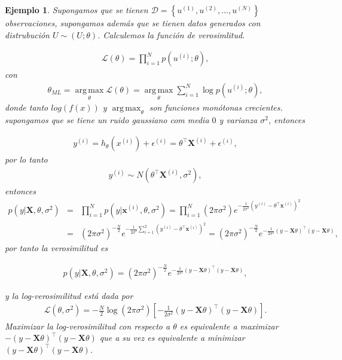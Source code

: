 \documentclass[12pt]{article}
\newtheorem{Ejem}{Ejemplo}%
\begin{document}
\begin{Ejem}
Supongamos que se tienen $\mathcal{D}=\left\{u^{(1)},u^{(2)},\ldots,u^{(N)}\right\}$ observaciones, supongamos adem\'as que se tienen datos generados con distrubuci\'on $U\sim\left(U;\theta\right)$. Calculemos la funci\'on de verosimlitud.

\begin{eqnarray*}
\mathcal{L}\left(\theta\right)=\prod_{i=1}^{N}p\left(u^{(i)};\theta\right),
\end{eqnarray*}
con
\begin{eqnarray*}
\theta_{ML}=\operatorname*{arg\,max}_{\theta}\mathcal{L}\left(\theta\right)=\operatorname*{arg\,max}_{\theta}\sum_{i=1}^{N}\log p\left(u^{(i)};\theta\right),
\end{eqnarray*}
donde tanto $log(f(x))$ y $\operatorname*{arg\,max}_{\theta}$ son funciones mon\'otonas crecientes. supongamos que se tiene un ruido gaussiano com media $0$ y varianza $\sigma^{2}$, entonces

\begin{eqnarray*}
y^{(i)}=h_{\theta}\left(x^{(i)}\right)+\epsilon^{(i)}=\theta^{\top}\mathbf{X}^{(i)}+\epsilon^{(i)},
\end{eqnarray*}
por lo tanto
\begin{eqnarray*}
y^{(i)}\sim N\left(\theta^{\top}\mathbf{X}^{(i)},\sigma^{2}\right), 
\end{eqnarray*}
entonces
\begin{eqnarray*}
p\left(y|\mathbf{X},\theta,\sigma^{2}\right)&=&\prod_{i=1}^{N}p\left(y|\mathbf{x}^{(i)},\theta,\sigma^{2}\right)=\prod_{i=1}^{N}\left(2\pi\sigma^{2}\right)e^{-\frac{1}{2\sigma^{2}}\left(y^{(i)}-\theta^{\top}\mathbf{x}^{(i)}\right)^{2}}\\
&=&\left(2\pi\sigma^{2}\right)^{-\frac{N}{2}}e^{-\frac{1}{2\sigma^{2}}\sum_{i=1}^{2}\left(y^{(i)}-\theta^{\top}\mathbf{x}^{(i)}\right)^{2}}=\left(2\pi\sigma^{2}\right)^{-\frac{N}{2}}e^{-\frac{1}{2\sigma^{2}}\left(y-\mathbf{X}\theta\right)^{\top}\left(y-\mathbf{X}\theta\right)},
\end{eqnarray*}
por tanto la verosimilitud es

\begin{eqnarray*}
p\left(y|\mathbf{X},\theta,\sigma^{2}\right)=\left(2\pi\sigma^{2}\right)^{-\frac{N}{2}}e^{-\frac{1}{2\sigma^{2}}\left(y-\mathbf{X}\theta\right)^{\top}\left(y-\mathbf{X}\theta\right)},
\end{eqnarray*}

y la log-verosimilitud est\'a dada por 
\begin{eqnarray*}
\mathcal{L}\left(\theta,\sigma^{2}\right)=-\frac{N}{2}\log\left(2\pi\sigma^{2}\right)\left[-\frac{1}{2\sigma^{2}}\left(y-\mathbf{X}\theta\right)^{\top}\left(y-\mathbf{X}\theta\right)\right].
\end{eqnarray*}
Maximizar la log-verosimilitud con respecto a $\theta$ es equivalente a maximizar $-\left(y-\mathbf{X}\theta\right)^{\top}\left(y-\mathbf{X}\theta\right)$ que a su vez es equivalente a minimizar $\left(y-\mathbf{X}\theta\right)^{\top}\left(y-\mathbf{X}\theta\right)$.
\end{Ejem}
\end{document}
